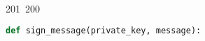 201~200~\documentclass{article}
\begin{document}
\begin{lstlisting}[language=Python, caption=Signing and Verifying Messages]
	                                                                                                                                                                                                                                                                                                	                                                                                                                                        	    	                                                                                                	                                                                                                                                                                                                                                                                                                                                	                                                                        	                                                                        	                                                                                                                                        	                                                                                                                                                                                                                        	                                                                                                def sign_message(private_key, message):
	                                                                                                                                                                                                                                                                                                	                                                                                                                                        	    	                                                                                                	                                                                                                                                                                                                                                                                                                                                	                                                                        	                                                                        	                                                                                                                                        	                                                                                                                                                                                                                        	                                                                                                    """

\end{lstlisting}
\end{document}
